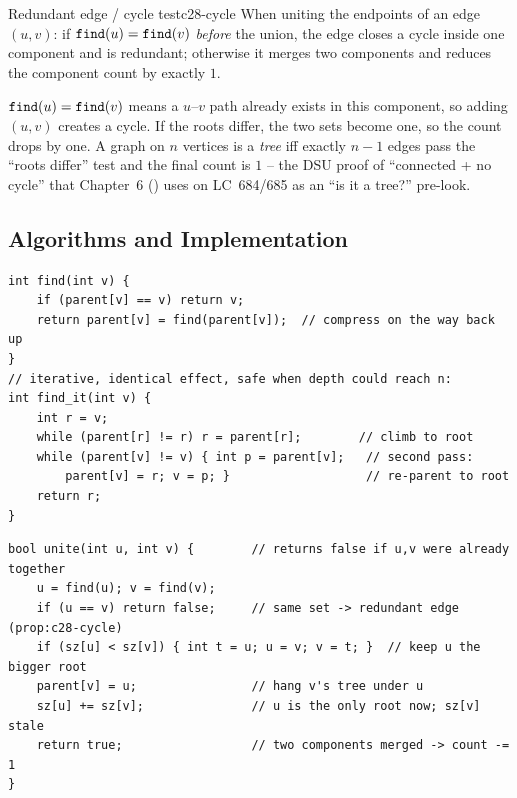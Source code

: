 \begin{proposition}{Redundant edge / cycle test}{c28-cycle}
When uniting the endpoints of an edge \((u,v)\): if \(\texttt{find}(u)=\texttt{find}(v)\)
\emph{before} the union, the edge closes a cycle inside one component and is
redundant; otherwise it merges two components and reduces the component count
by exactly \(1\).
\end{proposition}
\begin{proofbox}
\(\texttt{find}(u)=\texttt{find}(v)\) means a \(u\)--\(v\) path already exists in
this component, so adding \((u,v)\) creates a cycle.  If the roots differ, the
two sets become one, so the count drops by one.  A graph on \(n\) vertices is a
\emph{tree} iff exactly \(n-1\) edges pass the ``roots differ'' test and the
final count is \(1\) -- the DSU proof of ``connected + no cycle'' that
Chapter~6 () uses on LC~684/685 as an ``is it a tree?'' pre-look.
\end{proofbox}

\subsection{Algorithms and Implementation}

\begin{lstlisting}[caption={find with path compression (recursive; iterative form avoids deep chains)}, label={lst:c28-find}]
int find(int v) {
    if (parent[v] == v) return v;
    return parent[v] = find(parent[v]);  // compress on the way back up
}
// iterative, identical effect, safe when depth could reach n:
int find_it(int v) {
    int r = v;
    while (parent[r] != r) r = parent[r];        // climb to root
    while (parent[v] != v) { int p = parent[v];   // second pass:
        parent[v] = r; v = p; }                   // re-parent to root
    return r;
}
\end{lstlisting}

\begin{lstlisting}[caption={union by size (attach the smaller root under the larger)}, label={lst:c28-union}]
bool unite(int u, int v) {        // returns false if u,v were already together
    u = find(u); v = find(v);
    if (u == v) return false;     // same set -> redundant edge (prop:c28-cycle)
    if (sz[u] < sz[v]) { int t = u; u = v; v = t; }  // keep u the bigger root
    parent[v] = u;                // hang v's tree under u
    sz[u] += sz[v];               // u is the only root now; sz[v] stale
    return true;                  // two components merged -> count -= 1
}
\end{lstlisting}

